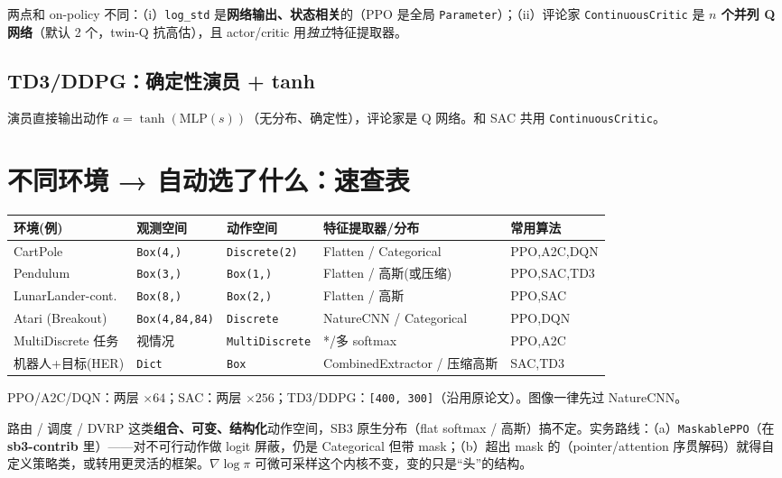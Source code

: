 \documentclass[11pt,a4paper]{article}
\begin{document}
两点和 on-policy 不同：（i）\texttt{log\_std} 是\textbf{网络输出、状态相关}的（PPO 是全局 \texttt{Parameter}）；（ii）评论家 \texttt{ContinuousCritic} 是 \textbf{$n$ 个并列 Q 网络}（默认 2 个，twin-Q 抗高估），且 actor/critic 用\emph{独立}特征提取器。

\subsection{TD3/DDPG：确定性演员 + tanh}

演员直接输出动作 $a=\tanh(\text{MLP}(s))$（无分布、确定性），评论家是 Q 网络。和 SAC 共用 \texttt{ContinuousCritic}。

\section{不同环境 → 自动选了什么：速查表}

\begin{center}
\small
\begin{tabular}{l l l l l}
\toprule
\textbf{环境(例)} & \textbf{观测空间} & \textbf{动作空间} & \textbf{特征提取器/分布} & \textbf{常用算法} \\
\midrule
CartPole & \texttt{Box(4,)} & \texttt{Discrete(2)} & Flatten / Categorical & PPO,A2C,DQN \\
Pendulum & \texttt{Box(3,)} & \texttt{Box(1,)} & Flatten / 高斯(或压缩) & PPO,SAC,TD3 \\
LunarLander-cont. & \texttt{Box(8,)} & \texttt{Box(2,)} & Flatten / 高斯 & PPO,SAC \\
Atari (Breakout) & \texttt{Box(4,84,84)} & \texttt{Discrete} & NatureCNN / Categorical & PPO,DQN \\
MultiDiscrete 任务 & 视情况 & \texttt{MultiDiscrete} & */多 softmax & PPO,A2C \\
机器人+目标(HER) & \texttt{Dict} & \texttt{Box} & CombinedExtractor / 压缩高斯 & SAC,TD3 \\
\bottomrule
\end{tabular}
\end{center}

\begin{keybox}
PPO/A2C/DQN：两层 $\times 64$；SAC：两层 $\times 256$；TD3/DDPG：\texttt{[400, 300]}（沿用原论文）。图像一律先过 NatureCNN。
\end{keybox}

\begin{tiebox}[联系你的运筹方向]
路由 / 调度 / DVRP 这类\textbf{组合、可变、结构化}动作空间，SB3 原生分布（flat softmax / 高斯）搞不定。实务路线：（a）\texttt{MaskablePPO}（在 \textbf{sb3-contrib} 里）——对不可行动作做 logit 屏蔽，仍是 Categorical 但带 mask；（b）超出 mask 的（pointer/attention 序贯解码）就得自定义策略类，或转用更灵活的框架。$\nabla\log\pi$ 可微可采样这个内核不变，变的只是“头”的结构。
\end{tiebox}
\end{document}
